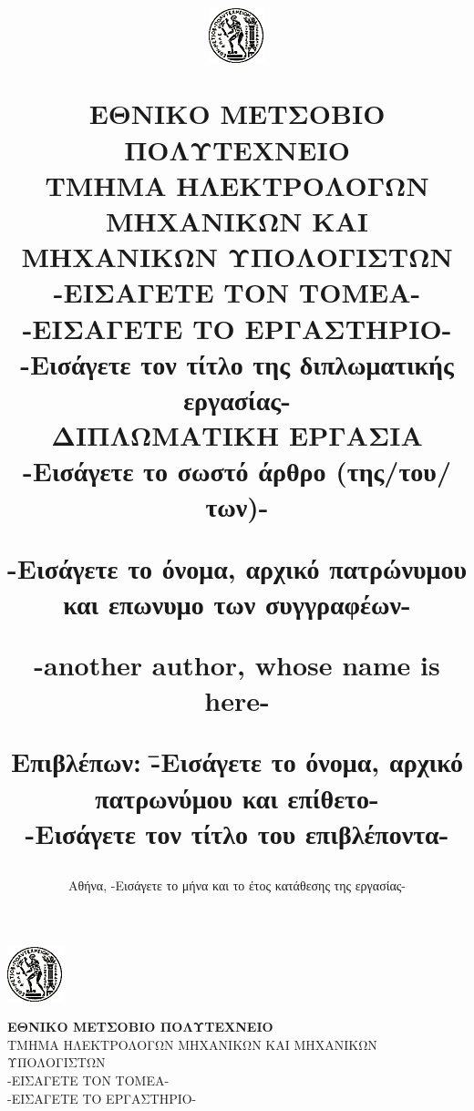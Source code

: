 \documentclass[12pt, twoside, a4paper]{report}
\begin{document}

\title{
\vspace{-6ex}
\begin{center}
\includegraphics[scale=1]{pyrforos.png}  %
\end{center}
\Large{Ε}\large{ΘΝΙΚΟ}
\Large{Μ}\large{ΕΤΣΟΒΙΟ}
\Large{Π}\large{ΟΛΥΤΕΧΝΕΙΟ} \\
\normalsize{Τ}\small{ΜΗΜΑ}
\normalsize{Η}\small{ΛΕΚΤΡΟΛΟΓΩΝ}
\normalsize{Μ}\small{ΗΧΑΝΙΚΩΝ}
\normalsize{Κ}\small{ΑΙ}
\normalsize{Μ}\small{ΗΧΑΝΙΚΩΝ}
\normalsize{Υ}\small{ΠΟΛΟΓΙΣΤΩΝ} \\
\vspace{2ex}
-ΕΙΣΑΓΕΤΕ ΤΟΝ ΤΟΜΕΑ- \\
-ΕΙΣΑΓΕΤΕ ΤΟ ΕΡΓΑΣΤΗΡΙΟ- \\
\vspace{8ex}
\large \textbf{-Εισάγετε τον τίτλο της διπλωματικής εργασίας-} \\
\vspace{10ex}
\large
ΔΙΠΛΩΜΑΤΙΚΗ ΕΡΓΑΣΙΑ \\
\vspace{2ex}
\normalsize
-Εισάγετε το σωστό άρθρο (της/του/των)- \\
\vspace{2ex}
\parbox[c]{0.4\textwidth} { \center\textbf{
-Εισάγετε το όνομα, αρχικό πατρώνυμου και επωνυμο των συγγραφέων- }}
\parbox[c]{0.4\textwidth} { \center\textbf{
	-another author, whose name is here- }}
\vspace{10ex}
\flushleft
\begin{tabbing}
	\textbf{Επιβλέπων}: \= -Εισάγετε το όνομα, αρχικό πατρωνύμου
				και επίθετο- \\
			    \> -Εισάγετε τον τίτλο του επιβλέποντα-
\end{tabbing}
}
\date{
\normalsize
Αθήνα, -Εισάγετε το μήνα και το έτος κατάθεσης της εργασίας-}

\maketitle
\newpage
\hspace{10pt}
\includegraphics{pyrforos.png}  %
\noindent
\parbox[b]{0.6\textwidth} {\textbf{
\noindent
\normalsize{Ε}\small{ΘΝΙΚΟ}  %
\normalsize{Μ}\small{ΕΤΣΟΒΙΟ}
\normalsize{Π}\small{ΟΛΥΤΕΧΝΕΙΟ}} \\
\small
ΤΜΗΜΑ ΗΛΕΚΤΡΟΛΟΓΩΝ ΜΗΧΑΝΙΚΩΝ ΚΑΙ ΜΗΧΑΝΙΚΩΝ ΥΠΟΛΟΓΙΣΤΩΝ \\
-ΕΙΣΑΓΕΤΕ ΤΟΝ ΤΟΜΕΑ- \\
-ΕΙΣΑΓΕΤΕ ΤΟ ΕΡΓΑΣΤΗΡΙΟ-}
\end{document}
